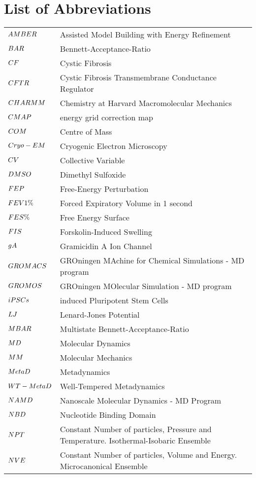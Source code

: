 \chapter*{List of Abbreviations}
\label{chap:abbrev}

\begin{center}
\begin{bfseries}
\newcommand\nomenclature[2]{#1 & #2 \\}
\begin{longtable}{@{}p{3cm}@{}p{\dimexpr\textwidth-1cm\relax}@{}}
\nomenclature{${\small AMBER}$}    {Assisted Model Building with Energy Refinement}
\nomenclature{${\small BAR}$}      {Bennett-Acceptance-Ratio}
\nomenclature{${\small CF}$}        {Cystic Fibrosis}
\nomenclature{${\small CFTR}$}      {Cystic Fibrosis Transmembrane Conductance Regulator}
\nomenclature{${\small CHARMM}$}   {Chemistry at Harvard Macromolecular Mechanics}
\nomenclature{${\small CMAP}$}     {energy grid correction map}
\nomenclature{${\small COM}$}      {Centre of Mass}
\nomenclature{${\small Cryo-EM}$}  {Cryogenic Electron Microscopy}
\nomenclature{${\small CV}$}       {Collective Variable}
\nomenclature{${\small DMSO}$}     {Dimethyl Sulfoxide}
\nomenclature{${\small FEP}$}      {Free-Energy Perturbation}
\nomenclature{${\small FEV1\%}$}   {Forced Expiratory Volume in 1 second}
\nomenclature{${\small FES\%}$}    {Free Energy Surface}
\nomenclature{${\small FIS}$}      {Forskolin-Induced Swelling}
\nomenclature{${\small gA}$}       {Gramicidin A Ion Channel}
\nomenclature{${\small GROMACS}$}  {GROningen MAchine for Chemical Simulations - MD program}
\nomenclature{${\small GROMOS}$}   {GROningen MOlecular Simulation - MD program}
\nomenclature{${\small iPSCs}$}    {induced Pluripotent Stem Cells}
\nomenclature{${\small LJ}$}       {Lenard-Jones Potential}
\nomenclature{${\small MBAR}$}     {Multistate Bennett-Acceptance-Ratio}
\nomenclature{${\small MD}$}       {Molecular Dynamics}
\nomenclature{${\small MM}$}       {Molecular Mechanics}
\nomenclature{${\small MetaD}$}    {Metadynamics}
\nomenclature{${\small WT-MetaD}$} {Well-Tempered Metadynamics}
\nomenclature{${\small NAMD}$}     {Nanoscale Molecular Dynamics - MD Program}
\nomenclature{${\small NBD}$}      {Nucleotide Binding Domain}
\nomenclature{${\small NPT}$}      {Constant Number of particles, Pressure and Temperature. Isothermal-Isobaric Ensemble}
\nomenclature{${\small NVE}$}      {Constant Number of particles, Volume and Energy. Microcanonical Ensemble}

\end{longtable}
\end{bfseries}
\end{center}
